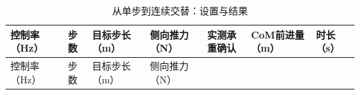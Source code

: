\FloatBarrier\begingroup\small\setlength{\tabcolsep}{2.5pt}
\begin{longtable}[]{@{}
  >{\raggedright\arraybackslash}p{}
  >{\raggedright\arraybackslash}p{}
  >{\raggedright\arraybackslash}p{}
  >{\raggedright\arraybackslash}p{}
  >{\raggedright\arraybackslash}p{}
  >{\raggedright\arraybackslash}p{}
  >{\raggedright\arraybackslash}p{}@{}}
\caption{从单步到连续交替：设置与结果}\label{tab:s26-1}\tabularnewline
\toprule\noalign{}
\begin{minipage}[b]{\linewidth}\raggedright
控制率（Hz）
\end{minipage} & \begin{minipage}[b]{\linewidth}\raggedright
步数
\end{minipage} & \begin{minipage}[b]{\linewidth}\raggedright
目标步长（m）
\end{minipage} & \begin{minipage}[b]{\linewidth}\raggedright
侧向推力（N）
\end{minipage} & \begin{minipage}[b]{\linewidth}\raggedright
实测承重确认
\end{minipage} & \begin{minipage}[b]{\linewidth}\raggedright
CoM前进量（m）
\end{minipage} & \begin{minipage}[b]{\linewidth}\raggedright
时长（s）
\end{minipage} \\
\midrule\noalign{}
\endfirsthead
\toprule\noalign{}
\begin{minipage}[b]{\linewidth}\raggedright
控制率（Hz）
\end{minipage} & \begin{minipage}[b]{\linewidth}\raggedright
步数
\end{minipage} & \begin{minipage}[b]{\linewidth}\raggedright
目标步长（m）
\end{minipage} & \begin{minipage}[b]{\linewidth}\raggedright
侧向推力（N）
\end{minipage} & \begin{minipage}[b]{\linewidth}\raggedright

\end{minipage}
\end{longtable}
